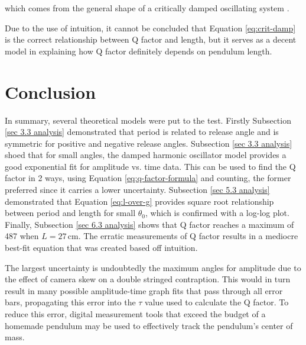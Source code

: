 \documentclass[11pt]{article}
\begin{document}
\begin{multicols}{2}
which comes from the general shape of a critically damped oscillating system \cite{crit-damping}.

Due to the use of intuition, it cannot be concluded that Equation \ref{eq:crit-damp} is the correct relationship between Q factor and length, but it serves as a decent model in explaining how Q factor definitely depends on pendulum length.

\section{Conclusion}
In summary, several theoretical models were put to the test. Firstly Subsection \ref{sec 3.3 analysis} demonstrated that period is related to release angle and is symmetric for positive and negative release angles. Subsection \ref{sec 3.3 analysis} shoed that for small angles, the damped harmonic oscillator model provides a good exponential fit for amplitude vs. time data. This can be used to find the Q factor in 2 ways, using Equation \ref{eq:q-factor-formula} and counting, the former preferred since it carries a lower uncertainty. Subsection \ref{sec 5.3 analysis} demonstrated that Equation \ref{eq:l-over-g} provides square root relationship between period and length for small $\theta_0$, which is confirmed with a log-log plot. Finally, Subsection \ref{sec 6.3 analysis} shows that Q factor reaches a maximum of 487 when $L = 27\,\text{cm}$. The erratic measurements of Q factor results in a mediocre best-fit equation that was created based off intuition.

The largest uncertainty is undoubtedly the maximum angles for amplitude due to the effect of camera skew on a double stringed contraption. This would in turn result in many possible amplitude-time graph fits that pass through all error bars, propagating this error into the $\tau$ value used to calculate the Q factor. To reduce this error, digital measurement tools that exceed the budget of a homemade pendulum may be used to effectively track the pendulum's center of mass.

\newpage

\end{multicols}

\printbibliography[heading=bibintoc]

\newpage

\appendix

% 
\end{document}
